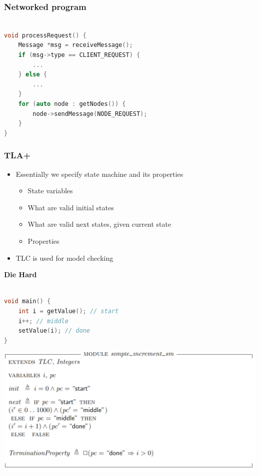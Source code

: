 \documentclass{beamer}
\begin{document}
\begin{frame}[fragile]
    \frametitle{Networked program}
	\begin{lstlisting}[language=C++]

void processRequest() {
    Message *msg = receiveMessage();
    if (msg->type == CLIENT_REQUEST) {
        ...
    } else {
        ...
    }
    for (auto node : getNodes()) {
        node->sendMessage(NODE_REQUEST);
    }
}

	\end{lstlisting}
	
\end{frame}

\begin{frame}
    \frametitle{TLA+}
    \begin{itemize}
        \item Essentially we specify state machine and its properties 
        \begin{itemize}
            \item State variables
            \item What are valid initial states 
            \item What are valid next states, given current state 
            \item Properties
        \end{itemize}
        \item TLC is used for model checking 
    \end{itemize}
\end{frame}


\begin{frame}
    \begin{center}
        \LARGE{\textbf{Die Hard}}
    \end{center}
\end{frame}


\begin{frame}[fragile]
	\begin{lstlisting}[language=C++]

void main() {
    int i = getValue(); // start
    i++; // middle
    setValue(i); // done
}

	\end{lstlisting}
	
\end{frame}

\begin{frame}[fragile]
    \includegraphics[width=\textwidth]{./sm_increment.png}
\end{frame}
\end{document}
